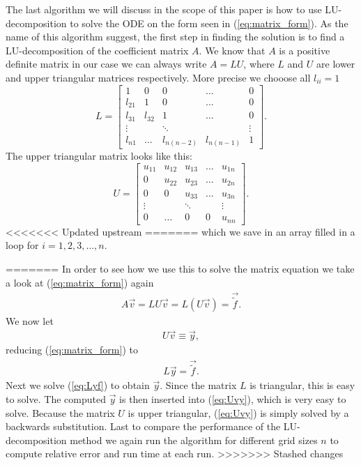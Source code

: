 \documentclass[twocolumn]{aastex62}
\begin{document}
The last algorithm we will discuss in the scope of this paper is how to use LU-decomposition to solve the ODE on the form seen in (\ref{eq:matrix_form}). As the name of this algorithm suggest, the first step in finding the solution is to find a LU-decomposition of the coefficient matrix $A$. We know that $A$ is a positive definite matrix in our case we can always write $A = LU$, where $L$ and $U$ are lower and upper triangular matrices respectively. More precise we chooose all $l_{ii} = 1$
$$L = 
\begin{bmatrix}
	1 & 0 & 0 & \hdots & 0\\
	l_{21} & 1 & 0 & \hdots & 0\\
	l_{31} & l_{32} & 1 &\hdots & 0\\
	\vdots & & \ddots & & \vdots\\
	l_{n1} & \hdots & l_{n(n-2)} & l_{n(n-1)} & 1
\end{bmatrix}.
$$
The upper triangular matrix looks like this:
$$U = 
\begin{bmatrix}
	u_{11} & u_{12} & u_{13} & \hdots & u_{1n}\\
	0 & u_{22} & u_{23} & \hdots & u_{2n}\\
	0 & 0 & u_{33} &\hdots & u_{3n}\\
	\vdots & & \ddots & & \vdots\\
	0 & \hdots & 0 & 0 & u_{nn}
\end{bmatrix}.
$$
<<<<<<< Updated upstream
=======
which we save in an array filled in a loop for $i = 1, 2, 3,\ldots, n$.

=======
In order to see how we use this to solve the matrix equation we take a look at (\ref{eq:matrix_form}) again
\begin{align}
	A\vec{v} = LU\vec{v} = L(U\vec{v}) = \vec{\tilde{f}}.
\end{align}
We now let 
\begin{align}
	U\vec{v} \equiv \vec{y},
	\label{eq:Uvy}
\end{align}
reducing (\ref{eq:matrix_form}) to
\begin{align}
	L\vec{y} = \vec{\tilde{f}}.
	\label{eq:Lyf}
\end{align} 
Next we solve (\ref{eq:Lyf}) to obtain $\vec{y}$. Since the matrix $L$ is triangular, this is easy to solve. The computed $\vec{y}$ is then inserted into (\ref{eq:Uvy}), which is very easy to solve. Because the matrix $U$ is upper triangular, (\ref{eq:Uvy}) is simply solved by a backwards substitution. 
Last to compare the performance of the LU-decomposition method we again run the algorithm for different grid sizes $n$ to compute relative error and run time at each run. 
>>>>>>> Stashed changes
\end{document}
